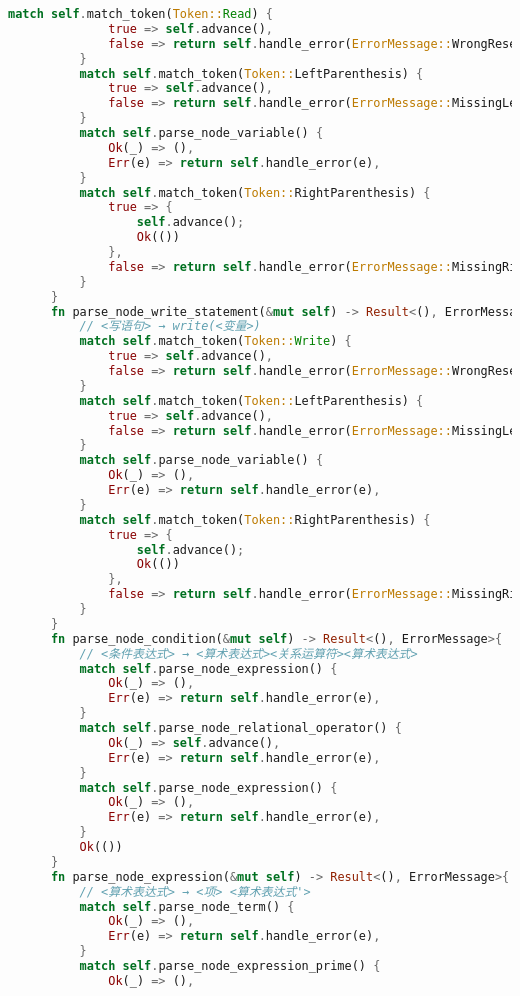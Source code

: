 \begin{lstlisting}[caption={语法分析器parse.rs}, label={4:code-example}, captionpos=t, language=rust]
          match self.match_token(Token::Read) {
              true => self.advance(),
              false => return self.handle_error(ErrorMessage::WrongReserveYouMeanRead)
          }
          match self.match_token(Token::LeftParenthesis) {
              true => self.advance(),
              false => return self.handle_error(ErrorMessage::MissingLeftParenthesis)
          }
          match self.parse_node_variable() {
              Ok(_) => (),
              Err(e) => return self.handle_error(e),
          }
          match self.match_token(Token::RightParenthesis) {
              true => {
                  self.advance();
                  Ok(())
              },
              false => return self.handle_error(ErrorMessage::MissingRightParenthesis)
          }
      }
      fn parse_node_write_statement(&mut self) -> Result<(), ErrorMessage>{
          // <写语句> → write(<变量>)
          match self.match_token(Token::Write) {
              true => self.advance(),
              false => return self.handle_error(ErrorMessage::WrongReserveYouMeanWrite)
          }
          match self.match_token(Token::LeftParenthesis) {
              true => self.advance(),
              false => return self.handle_error(ErrorMessage::MissingLeftParenthesis)
          }
          match self.parse_node_variable() {
              Ok(_) => (),
              Err(e) => return self.handle_error(e),
          }
          match self.match_token(Token::RightParenthesis) {
              true => {
                  self.advance();
                  Ok(())
              },
              false => return self.handle_error(ErrorMessage::MissingRightParenthesis)
          }
      }
      fn parse_node_condition(&mut self) -> Result<(), ErrorMessage>{
          // <条件表达式> → <算术表达式><关系运算符><算术表达式>
          match self.parse_node_expression() {
              Ok(_) => (),
              Err(e) => return self.handle_error(e),
          }
          match self.parse_node_relational_operator() {
              Ok(_) => self.advance(),
              Err(e) => return self.handle_error(e),
          }
          match self.parse_node_expression() {
              Ok(_) => (),
              Err(e) => return self.handle_error(e),
          }
          Ok(())
      }
      fn parse_node_expression(&mut self) -> Result<(), ErrorMessage>{
          // <算术表达式> → <项> <算术表达式'>
          match self.parse_node_term() {
              Ok(_) => (),
              Err(e) => return self.handle_error(e),
          }
          match self.parse_node_expression_prime() {
              Ok(_) => (),

\end{lstlisting}
